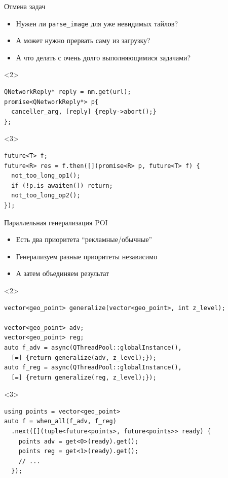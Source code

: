 \documentclass[aspectratio=169,pdf,hyperref={unicode},14pt]{beamer}
\begin{document}
\begin{frame}[fragile,t]{Отмена задач}
 \begin{itemize}[<+->]
  \item Нужен ли \texttt{parse\_image} для уже невидимых тайлов?
  \item А может нужно прервать саму из загрузку?
  \item А что делать с очень долго выполняющимися задачами?
 \end{itemize}
 \begin{onlyenv}<2>
 \begin{lstlisting}[style=cppcode]
QNetworkReply* reply = nm.get(url);
promise<QNetworkReply*> p{
  canceller_arg, [reply] {reply->abort();}
};
 \end{lstlisting}
 \end{onlyenv}
 \begin{onlyenv}<3>
 \begin{lstlisting}[style=cppcode]
future<T> f;
future<R> res = f.then([](promise<R> p, future<T> f) {
  not_too_long_op1();
  if (!p.is_awaiten()) return;
  not_too_long_op2();
});
 \end{lstlisting}
 \end{onlyenv}
\end{frame}

\begin{frame}[fragile,t]{Параллельная генерализация POI}
 \begin{itemize}[<+->]
  \item Есть два приоритета ``рекламные/обычные''
  \item Генерализуем разные приоритеты независимо
  \item А затем объединяем результат
 \end{itemize}
 \begin{onlyenv}<2>
 \begin{lstlisting}[style=cppcode]
vector<geo_point> generalize(vector<geo_point>, int z_level);

vector<geo_point> adv;
vector<geo_point> reg;
auto f_adv = async(QThreadPool::globalInstance(),
  [=] {return generalize(adv, z_level);});
auto f_reg = async(QThreadPool::globalInstance(),
  [=] {return generalize(reg, z_level);});
 \end{lstlisting}
 \end{onlyenv}
 \begin{onlyenv}<3>
 \begin{lstlisting}[style=cppcode]
using points = vector<geo_point>
auto f = when_all(f_adv, f_reg)
  .next([](tuple<future<points>, future<points>> ready) {
    points adv = get<0>(ready).get();
    points reg = get<1>(ready).get();
    // ...
  });
 \end{lstlisting}
 \end{onlyenv}
\end{frame}
\end{document}
